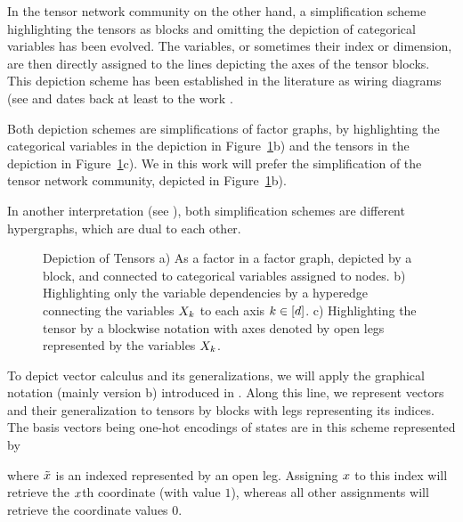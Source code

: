 In the tensor network community on the other hand, a simplification scheme highlighting the tensors as blocks and omitting the depiction of categorical variables has been evolved.
The variables, or sometimes their index or dimension, are then directly assigned to the lines depicting the axes of the tensor blocks.
This depiction scheme has been established in the literature as wiring diagrams (see \cite{landsberg_tensors_2011} and dates back at least to the work \cite{penrose_spinors_1987}.

Both depiction schemes are simplifications of factor graphs, by highlighting the categorical variables in the depiction in Figure~\ref{fig:tensors}b) and the tensors in the depiction in Figure~\ref{fig:tensors}c).
We in this work will prefer the simplification of the tensor network community, depicted in Figure~\ref{fig:tensors}b).

In another interpretation (see \cite{robeva_duality_2019}), both simplification schemes are different hypergraphs, which are dual to each other.

\begin{figure}[h!]
	\begin{center}
		
	\end{center}
	\caption{Depiction of Tensors
	a) As a factor in a factor graph, depicted by a block, and connected to categorical variables assigned to nodes.
	b) Highlighting only the variable dependencies by a hyperedge connecting the variables $X_{k}$ to each axis $k\in[d]$.
	c) Highlighting the tensor by a blockwise notation with axes denoted by open legs represented by the variables $X_{k}$.
	}\label{fig:tensors}
\end{figure}


To depict vector calculus and its generalizations, we will apply the graphical notation (mainly version b) introduced in .
Along this line, we represent vectors and their generalization to tensors by blocks with legs representing its indices.
The basis vectors being one-hot encodings of states are in this scheme represented by
	\begin{center}
		
	\end{center}
where $\tilde{x}$ is an indexed represented by an open leg.
Assigning $x$ to this index will retrieve the $x$th coordinate (with value $1$), whereas all other assignments will retrieve the coordinate values $0$.


